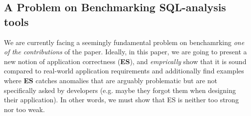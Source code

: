 \documentclass[12pt,letter]{article}
\begin{document}

\subsection*{A Problem on Benchmarking SQL-analysis tools} 
We are currently facing a seemingly fundamental problem on benchamrking \emph{one of
the contributions} of the paper. Ideally, in this paper, we are going to present a new notion of
application correctness ({\bf ES}), and \emph{emprically} show that it is sound compared to
real-world application requirements and additionally find examples where {\bf
ES} catches anomalies that are arguably problematic but are not specifically
asked by developers (e.g. maybe they forgot them when designing their
application). In other words, we must show that ES is neither too strong nor too
weak.
\end{document}
